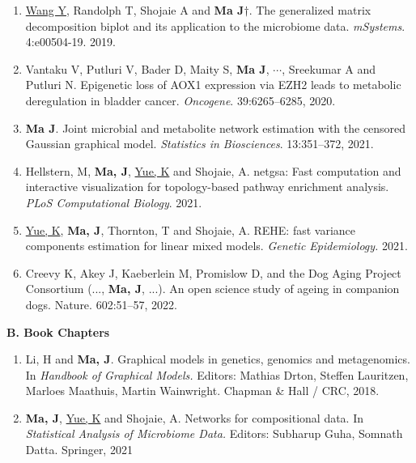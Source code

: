 \documentclass[10pt]{article}
\begin{document}
\begin{enumerate}
 \item \underline{Wang Y}, Randolph T, Shojaie A and \textbf{Ma J}{$\dagger$}. The generalized matrix decomposition biplot and its application to the microbiome data. {\em mSystems}. 4:e00504-19. 2019.
 \item Vantaku V, Putluri V, Bader D, Maity S, \textbf{Ma J}, $\cdots$, Sreekumar A and Putluri N. Epigenetic loss of AOX1 expression via EZH2 leads to metabolic deregulation in bladder cancer. {\em Oncogene}. 39:6265--6285, 2020.   
 \item \textbf{Ma J}. Joint microbial and metabolite network estimation with the censored Gaussian graphical model. {\em Statistics in Biosciences}. 13:351--372, 2021.
\item Hellstern, M, \textbf{Ma, J}, \underline{Yue, K} and Shojaie, A. netgsa: Fast computation and interactive visualization for topology-based pathway enrichment analysis. {\it PLoS Computational Biology}. 2021.
\item \underline{Yue, K}, \textbf{Ma, J}, Thornton, T and Shojaie, A. REHE: fast variance components estimation for linear mixed models. {\it Genetic Epidemiology.} 2021. 
\item Creevy K, Akey J, Kaeberlein M, Promislow D, and the Dog Aging Project Consortium (..., \textbf{Ma, J}, ...). An open science study of ageing in companion dogs. Nature. 602:51--57, 2022.
\end{enumerate}

\textbf{B. Book Chapters}
\begin{enumerate}
\item Li, H and \textbf{Ma, J}. Graphical models in genetics, genomics and metagenomics. In {\em Handbook of Graphical Models.} Editors: Mathias Drton, Steffen Lauritzen, Marloes Maathuis, Martin Wainwright. Chapman \& Hall / CRC, 2018.
\item \textbf{Ma, J}, \underline{Yue, K} and Shojaie, A. Networks for compositional data. In \emph{Statistical Analysis of Microbiome Data.} Editors: Subharup Guha, Somnath Datta. Springer, 2021
\end{enumerate}
\end{document}
